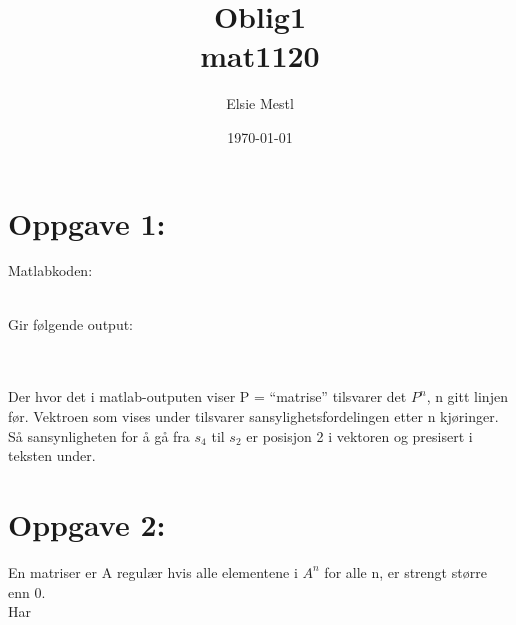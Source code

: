\documentclass[a4paper, norsk, twoside, 10pt]{article}
\date{\today}
\title{Oblig1 \\ mat1120}
\author{Elsie Mestl}
\begin{document}
\maketitle
\begin{flushleft}

  \def\matrixP{
    \begin{bmatrix}
      1 & 0.7 & 0 & 0 & 0 \\
      0 & 0   & 0.5 & 0 & 0 \\
      0 & 0.3 & 0 & 0.65 & 0 \\
      0 & 0   & 0.5 & 0 & 0 \\
      0 & 0 & 0 & 0.35 & 1 \\
    \end{bmatrix}
  }


  \section*{Oppgave 1:}
  Matlabkoden:
  
  \ \\
  Gir følgende output:
  
  \ \\
  \ \\
  Der hvor det i matlab-outputen viser P = ``matrise'' tilsvarer det $P^{n}$, n gitt linjen før. Vektroen som vises
  under tilsvarer sansylighetsfordelingen etter n kjøringer. Så sansynligheten for å gå fra $s_{4}$ til $s_{2}$ er posisjon 2 i vektoren
  og presisert i teksten under.


  \section*{Oppgave 2:}

  En matriser er A regulær hvis alle elementene i $A^{n}$ for alle n, er strengt større enn 0.
  \ \\
  Har
  \def\PI{
    \begin{bmatrix}
      0 & 0.7 & 0 & 0 & 0 \\
      0 & -1   & 0.5 & 0 & 0 \\
      0 & 0.3 & -1 & 0.65 & 0 \\
      0 & 0   & 0.5 & -1 & 0 \\
      0 & 0 & 0 & 0.35 & 0 \\
    \end{bmatrix}
  }



\end{flushleft}
\end{document}
